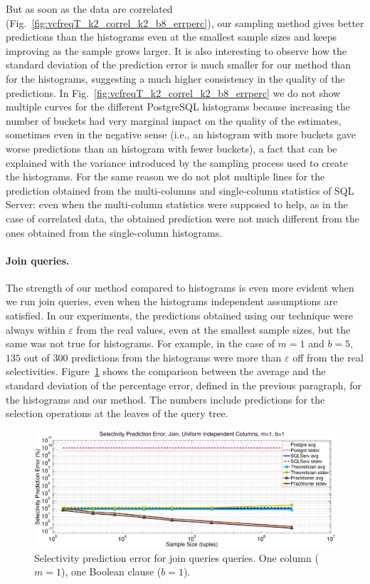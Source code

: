 But as soon as the data are
correlated (Fig.~\ref{fig:vcfreqT_k2_correl_k2_b8_errperc}), our sampling method gives better
predictions than the histograms even at the smallest sample sizes and keeps
improving as the sample grows larger. It is also interesting to observe how the
standard deviation of the prediction error is much smaller for our method than
for the histograms, suggesting a much higher consistency in the quality of the
predictions. In Fig.~\ref{fig:vcfreqT_k2_correl_k2_b8_errperc} we do not show multiple
curves for the different PostgreSQL histograms because increasing the number of
buckets had very marginal impact on the quality of the estimates, sometimes even
in the negative sense (i.e., an histogram with more buckets gave worse
predictions than an histogram with fewer buckets), a fact that can be explained
with the variance introduced by the sampling process used to create the
histograms. For the same reason we do not plot multiple lines for the
prediction obtained from the multi-columns and single-column statistics of SQL
Server: even when the multi-column statistics were supposed to help, as in the
case of correlated data, the obtained prediction were not much different from
the ones obtained from the single-column histograms.

\paragraph{Join queries.} The strength of our method compared to histograms is
even more evident when we run join queries, even when the histograms independent assumptions are
satisfied. In our experiments, the predictions obtained using our technique were
always within $\varepsilon$ from the real values, even at the smallest sample
sizes, but the same was not true for histograms. For example, in the case of
$m=1$ and $b=5$, $135$ out of $300$ predictions from the histograms were more
than $\varepsilon$ off from the real selectivities.
Figure~\ref{fig:vcfreqjoin_k1_b1_errperc} shows the comparison between the average and
the standard deviation of the percentage error, defined in the previous
paragraph, for the histograms and our method. The numbers include predictions
for the selection operations at the leaves of the query tree.

\begin{figure}[htbp]
  \centering
  \includegraphics[scale=0.3]{vcfreq/join_k1_b1_errperc}
  \caption{Selectivity prediction error for join queries queries. One column
  ($m=1$), one Boolean clause ($b=1$).}
  \label{fig:vcfreqjoin_k1_b1_errperc}
\end{figure}

